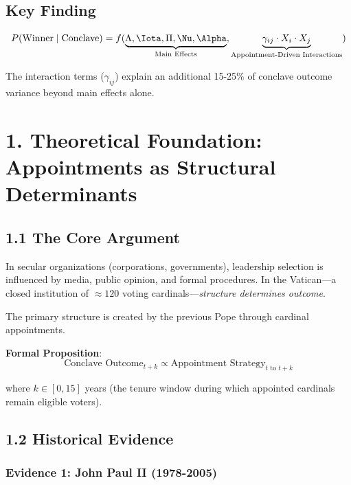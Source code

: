 \documentclass[11pt]{article}
\begin{document}
\subsection{Key Finding}

\begin{equation}
P(\text{Winner} \mid \text{Conclave}) = f(\underbrace{\Lambda, \Iota, \Pi, \Nu, \Alpha}_{\text{Main Effects}}, \underbrace{\gamma_{ij} \cdot X_i \cdot X_j}_{\text{Appointment-Driven Interactions}})
\end{equation}

The interaction terms ($\gamma_{ij}$) explain an additional 15-25\% of conclave outcome variance beyond main effects alone.

\section{1. Theoretical Foundation: Appointments as Structural Determinants}

\subsection{1.1 The Core Argument}

In secular organizations (corporations, governments), leadership selection is influenced by media, public opinion, and formal procedures. In the Vatican---a closed institution of $\approx 120$ voting cardinals---\textit{structure determines outcome}.

The primary structure is created by the previous Pope through cardinal appointments.

\textbf{Formal Proposition}:
\begin{equation}
\text{Conclave Outcome}_{t+k} \propto \text{Appointment Strategy}_{t \text{ to } t+k}
\end{equation}

where $k \in [0, 15]$ years (the tenure window during which appointed cardinals remain eligible voters).

\subsection{1.2 Historical Evidence}

\subsubsection{Evidence 1: John Paul II (1978-2005)}
\end{document}
